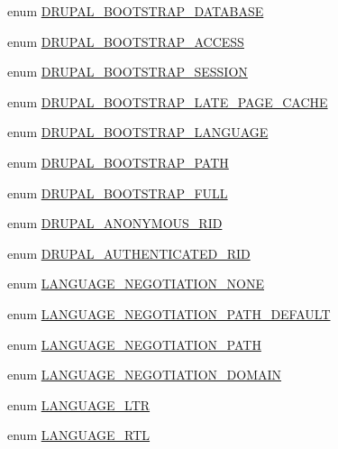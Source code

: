 \begin{CompactItemize}
\item 
enum \hyperlink{bootstrap_8inc_693d842eaaf448b1e6c37cc4ef068e3a}{DRUPAL\_\-BOOTSTRAP\_\-DATABASE} 
\item 
enum \hyperlink{bootstrap_8inc_1f2edb3f8e05ef17adfb116fa0cfac8e}{DRUPAL\_\-BOOTSTRAP\_\-ACCESS} 
\item 
enum \hyperlink{bootstrap_8inc_a6c510376f042cd2d05fc9bb458e7138}{DRUPAL\_\-BOOTSTRAP\_\-SESSION} 
\item 
enum \hyperlink{bootstrap_8inc_ddfe2406691de4bbb8fceba3ac83ee1a}{DRUPAL\_\-BOOTSTRAP\_\-LATE\_\-PAGE\_\-CACHE} 
\item 
enum \hyperlink{bootstrap_8inc_e4a0a1bc1243082285abc3fc052e5d38}{DRUPAL\_\-BOOTSTRAP\_\-LANGUAGE} 
\item 
enum \hyperlink{bootstrap_8inc_4366634a7ebd903c25d1f04737f17f4f}{DRUPAL\_\-BOOTSTRAP\_\-PATH} 
\item 
enum \hyperlink{bootstrap_8inc_2c8ac509af1924cf2fa7420a22e1b048}{DRUPAL\_\-BOOTSTRAP\_\-FULL} 
\item 
enum \hyperlink{bootstrap_8inc_c7816037c6b6b794a56dcce4dea70569}{DRUPAL\_\-ANONYMOUS\_\-RID} 
\item 
enum \hyperlink{bootstrap_8inc_c2d2d9cd4c8559510f9baa997525373e}{DRUPAL\_\-AUTHENTICATED\_\-RID} 
\item 
enum \hyperlink{bootstrap_8inc_ea1c293260404804b9cd8317f9559e70}{LANGUAGE\_\-NEGOTIATION\_\-NONE} 
\item 
enum \hyperlink{bootstrap_8inc_1614b466569aa36b6c7214c154ec766b}{LANGUAGE\_\-NEGOTIATION\_\-PATH\_\-DEFAULT} 
\item 
enum \hyperlink{bootstrap_8inc_5a3d6548cae60a6c58cb7673b31abfeb}{LANGUAGE\_\-NEGOTIATION\_\-PATH} 
\item 
enum \hyperlink{bootstrap_8inc_4364d1b8742532db73639f34457529ef}{LANGUAGE\_\-NEGOTIATION\_\-DOMAIN} 
\item 
enum \hyperlink{bootstrap_8inc_8790965df4de009fe8bdcf17f6a5c738}{LANGUAGE\_\-LTR} 
\item 
enum \hyperlink{bootstrap_8inc_c3c2ed4c787f238d2d39d644dbdcb6d4}{LANGUAGE\_\-RTL} 
\end{CompactItemize}
